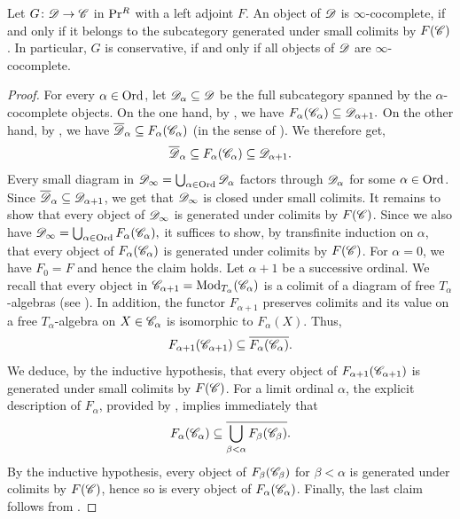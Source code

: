 \documentclass[12pt]{article}
\begin{document}
\begin{prop}\label{cocomplete_Is_Generated}
    Let $G\colon \mathscr{D} \to \mathscr{C}$ in $\mathrm{Pr}{}^R$ with a left adjoint $F$. An object of $\mathscr{D}$ is $\infty$-cocomplete, if and only if it belongs to the subcategory generated under small colimits by $F(\mathscr{C})$. In particular, $G$ is conservative, if and only if all objects of $\mathscr{D}$ are $\infty$-cocomplete.  
\end{prop}
\begin{proof}
    For every $\alpha \in \mathrm{Ord}$, 
    let $\mathscr{D}_{\alpha} \subseteq \mathscr{D}$ be the full subcategory spanned by the $\alpha$-cocomplete objects.
    On the one hand, by , we have $F_\alpha(\mathscr{C}_\alpha) \subseteq \mathscr{D}_{\alpha+1}.$
    On the other hand, by , we have 
    $\overline{\mathscr{D}}_\alpha \subseteq F_\alpha(\mathscr{C}_\alpha)$ (in the sense of ). 
    We therefore get,
    \[
        \overline{\mathscr{D}}_{\alpha} \subseteq 
        F_{\alpha}(\mathscr{C}_{\alpha}) \subseteq
        \mathscr{D}_{\alpha+1}.
    \]
    Every small diagram in 
    \(
        \mathscr{D}_\infty =
        \bigcup_{\alpha\in\mathrm{Ord}} \mathscr{D}_{\alpha}
    \)
    factors through $\mathscr{D}_\alpha$ for some $\alpha \in \mathrm{Ord}$. Since $\overline{\mathscr{D}}_{\alpha} \subseteq \mathscr{D}_{\alpha+1}$, we get that $\mathscr{D}_\infty$ is closed under small colimits. It remains to show that every object of $\mathscr{D}_\infty$ is generated under colimits by $F(\mathscr{C})$.
    Since we also have 
    \(
        \mathscr{D}_\infty = 
         \bigcup_{\alpha\in\mathrm{Ord}} F_\alpha(\mathscr{C}_\alpha),
    \)
    it suffices to show, by transfinite induction on $\alpha$, that every object of $F_\alpha(\mathscr{C}_\alpha)$ is generated under colimits by $F(\mathscr{C})$.
    For $\alpha=0$, we have $F_0=F$ and hence the claim holds. Let $\alpha+1$ be a successive ordinal. We recall that every object in  $\mathscr{C}_{\alpha+1}=\operatorname{\operatorname{Mod}}_{T_\alpha}(\mathscr{C}_\alpha)$
    is a colimit of a diagram of free $T_\alpha$-algebras (see ). In addition, the functor $F_{\alpha+1}$ preserves colimits and its value on a free $T_\alpha$-algebra on $X\in\mathscr{C}_\alpha$ is isomorphic to $F_\alpha(X)$. Thus,
    \[
        F_{\alpha+1}(\mathscr{C}_{\alpha+1}) \subseteq \overline{F_\alpha(\mathscr{C}_\alpha)}.
    \]
    We deduce, by the inductive hypothesis, that every object of $F_{\alpha+1}(\mathscr{C}_{\alpha+1})$ is generated under small colimits by $F(\mathscr{C})$.
    For a limit ordinal $\alpha$, the explicit description of $F_\alpha$, provided by \cite[Theorem B]{horev2017conjugates}, implies immediately that
    \[
        F_\alpha(\mathscr{C}_\alpha) \subseteq 
        \overline{\bigcup_{\beta<\alpha}F_\beta(\mathscr{C}_\beta)}.
    \]
    By the inductive hypothesis, every object of $F_\beta(\mathscr{C}_\beta)$ for $\beta<\alpha$ is generated under colimits by $F(\mathscr{C})$, hence so is every object of $F_\alpha(\mathscr{C}_\alpha)$. Finally, the last claim follows from .
\end{proof}
\end{document}
